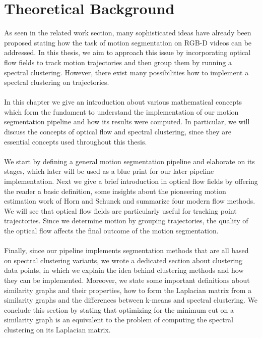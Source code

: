 \chapter{Theoretical Background}
As seen in the related work section, many sophisticated ideas have already been proposed stating how the task of motion segmentation on RGB-D videos can be addressed. In this thesis, we aim to approach this issue by incorporating optical flow fields to track motion trajectories and then group them by running a spectral clustering. However, there exist many possibilities how to implement a spectral clustering on trajectories. \\ \\
In this chapter we give an introduction about various mathematical concepts which form the fundament to understand the implementation of our motion segmentation pipeline and how its results were computed. In particular, we will discuss the concepts of optical flow and spectral clustering, since they are essential concepts used throughout this thesis. \\ \\
We start by defining a general motion segmentation pipeline and elaborate on its stages, which later will be used as a blue print for our later pipeline implementation. Next we give a brief introduction in optical flow fields by offering the reader a basic definition, some insights about the pioneering motion estimation work of Horn and Schunck and summarize four modern flow methods. We will see that optical flow fields are particularly useful for tracking point trajectories. Since we determine motion by grouping trajectories, the quality of the optical flow affects the final outcome of the motion segmentation. \\ \\
Finally, since our pipeline implements segmentation methods that are all based on spectral clustering variants, we wrote a dedicated section about clustering data points, in which we explain the idea behind clustering methods and how they can be implemented. Moreover, we state some important definitions about similarity graphs and their properties, how to form the Laplacian matrix from a similarity graphs and the differences between k-means and spectral clustering. We conclude this section by stating that optimizing for the minimum cut on a similarity graph is an equivalent to the problem of computing the spectral clustering on its Laplacian matrix. 

